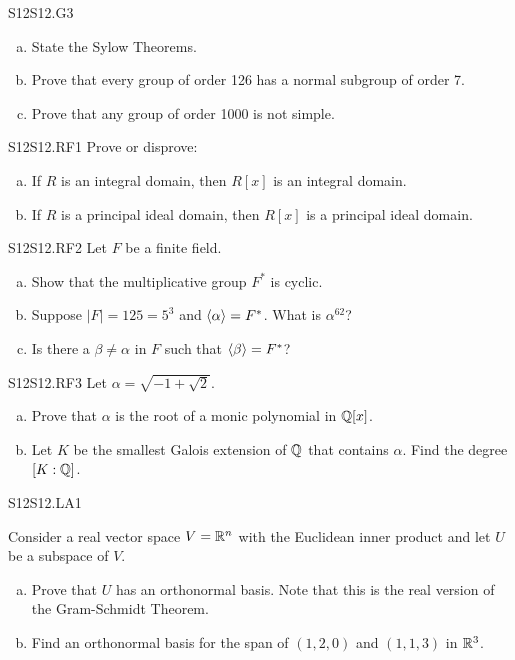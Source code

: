 \documentclass[../AlgebraQualSolutions.tex]{subfiles}
\begin{document}
	\begin{prob}{S12}{S12.G3}
		\begin{enumerate}[(a)]
			\item State the Sylow Theorems.
			\item Prove that every group of order 126 has a normal subgroup of order 7.
			\item Prove that any group of order 1000 is not simple.
		\end{enumerate}
	\end{prob}

	\begin{prob}{S12}{S12.RF1}
		Prove or disprove:

		\begin{enumerate}[(a)]
			\item If $R$ is an integral domain, then $R[x]$ is an integral domain.
			\item If $R$ is a principal ideal domain, then $R[x]$ is a principal ideal domain.
		\end{enumerate}
	\end{prob}

	\begin{prob}{S12}{S12.RF2}
		Let $F$ be a finite field.

		\begin{enumerate}[(a)]
			\item Show that the multiplicative group $F^*$ is cyclic.
			\item Suppose $|F| = 125 = 5^3$ and $\langle \alpha \rangle = F^*$. What is $\alpha^{62}$?
			\item Is there a $\beta \neq \alpha$ in $F$ such that $\langle \beta \rangle = F^*$?
		\end{enumerate}
	\end{prob}

	\begin{prob}{S12}{S12.RF3}
		Let $\alpha = \sqrt{-1+\sqrt{2}}$.
		\begin{enumerate}[(a)]
			\item Prove that $\alpha$ is the root of a monic polynomial in $\mathbb{Q}[x]$.
			\item Let $K$ be the smallest Galois extension of $\mathbb{Q}$ that contains $\alpha$. Find the degree $[K: \mathbb{Q}]$.
		\end{enumerate}
	\end{prob}

	\begin{prob}{S12}{S12.LA1}

		Consider a real vector space $V = \mathbb{R}^n$ with the Euclidean inner product and let $U$ be a subspace of $V$.

		\begin{enumerate}[(a)]
			\item Prove that $U$ has an orthonormal basis. Note that this is the real version of the Gram-Schmidt Theorem.
			\item Find an orthonormal basis for the span of $(1,2,0)$ and $(1,1,3)$ in $\mathbb{R}^3$.
		\end{enumerate}
	\end{prob}
\end{document}
